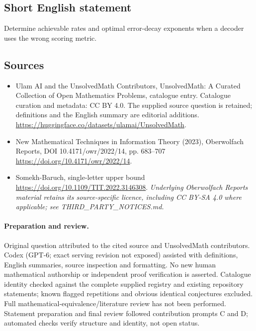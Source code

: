 \documentclass[11pt]{article}
\begin{document}
\subsection{Short English statement}
Determine achievable rates and optimal error-decay exponents when a decoder uses the wrong scoring metric.
\subsection{Sources}
\begin{itemize}
\item[\hypertarget{source:statement:1}{S1}] Ulam AI and the UnsolvedMath Contributors, UnsolvedMath: A Curated Collection of Open Mathematics Problems, catalogue entry. Catalogue curation and metadata: CC BY 4.0. The supplied source question is retained; definitions and the English summary are editorial additions.
\url{https://huggingface.co/datasets/ulamai/UnsolvedMath}.
\item[\hypertarget{source:statement:2}{S2}] New Mathematical Techniques in Information Theory (2023), Oberwolfach Reports, DOI 10.4171/owr/2022/14, pp. 683--707
\url{https://doi.org/10.4171/owr/2022/14}.
\item[\hypertarget{source:statement:3}{S3}] Somekh-Baruch, single-letter upper bound
\url{https://doi.org/10.1109/TIT.2022.3146308}.
\textit{Underlying Oberwolfach Reports material retains its source-specific licence, including CC BY-SA 4.0 where applicable; see THIRD\_PARTY\_NOTICES.md.}
\end{itemize}
\paragraph{Preparation and review.}
Original question attributed to the cited source and UnsolvedMath contributors. Codex (GPT-6; exact serving revision not exposed) assisted with definitions, English summaries, source inspection and formatting. No new human mathematical authorship or independent proof verification is asserted. Catalogue identity checked against the complete supplied registry and existing repository statements; known flagged repetitions and obvious identical conjectures excluded. Full mathematical-equivalence/literature review has not been performed. Statement preparation and final review followed contribution prompts C and D; automated checks verify structure and identity, not open status.
\label{end:statement}
\end{document}
